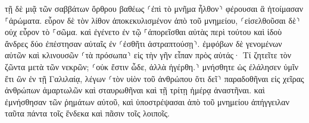 \documentclass{openreader}
\begin{document}
τῇ δὲ μιᾷ τῶν σαββάτων ὄρθρου βαθέως ⸂ἐπὶ τὸ μνῆμα ἦλθον⸃ φέρουσαι ἃ ἡτοίμασαν ⸀ἀρώματα. 
εὗρον δὲ τὸν λίθον ἀποκεκυλισμένον ἀπὸ τοῦ μνημείου, 
⸂εἰσελθοῦσαι δὲ⸃ οὐχ εὗρον τὸ ⸀σῶμα. 
καὶ ἐγένετο ἐν τῷ ⸀ἀπορεῖσθαι αὐτὰς περὶ τούτου καὶ ἰδοὺ ἄνδρες δύο ἐπέστησαν αὐταῖς ἐν ⸂ἐσθῆτι ἀστραπτούσῃ⸃. 
ἐμφόβων δὲ γενομένων αὐτῶν καὶ κλινουσῶν ⸂τὰ πρόσωπα⸃ εἰς τὴν γῆν εἶπαν πρὸς αὐτάς· Τί ζητεῖτε τὸν ζῶντα μετὰ τῶν νεκρῶν; 
⸂οὐκ ἔστιν ὧδε, ἀλλὰ ἠγέρθη.⸃ μνήσθητε ὡς ἐλάλησεν ὑμῖν ἔτι ὢν ἐν τῇ Γαλιλαίᾳ, 
λέγων ⸂τὸν υἱὸν τοῦ ἀνθρώπου ὅτι δεῖ⸃ παραδοθῆναι εἰς χεῖρας ἀνθρώπων ἁμαρτωλῶν καὶ σταυρωθῆναι καὶ τῇ τρίτῃ ἡμέρᾳ ἀναστῆναι. 
καὶ ἐμνήσθησαν τῶν ῥημάτων αὐτοῦ, 
καὶ ὑποστρέψασαι ἀπὸ τοῦ μνημείου ἀπήγγειλαν ταῦτα πάντα τοῖς ἕνδεκα καὶ πᾶσιν τοῖς λοιποῖς. 
\end{document}
